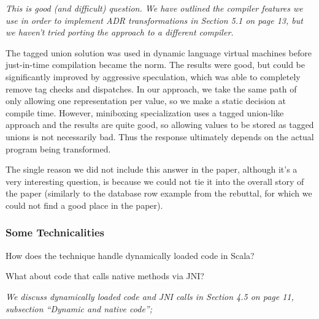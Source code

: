 \documentclass[9pt]{article}
\newenvironment{packed_item}{
\begin{itemize}
  \setlength{\itemsep}{1pt}
  \setlength{\parskip}{0.2pt}
  \setlength{\parsep}{0.2pt}
}{
  \end{itemize}
}
\newenvironment{reviewer-addr}
{ \color{OliveGreen} \framebox{{\bf FEEDBACK}} }
{  }
\newenvironment{answer}
{ \em \framebox{{\bf AUTHOR RESPONSE}} }
{  }
\begin{document}
\begin{answer}
This is good (and difficult) question. We have outlined the compiler features we use
in order to implement ADR transformations in Section 5.1 on page 13, but
we haven't tried porting the approach to a different compiler.

The tagged union solution was used in dynamic language virtual machines
before just-in-time compilation became the norm. The results were good,
but could be significantly improved by aggressive speculation, which was
able to completely remove tag checks and dispatches. In our approach, we
take the same path of only allowing one representation per value, so we
make a static decision at compile time. However, miniboxing specialization
uses a tagged union-like approach and the results are quite good, so
allowing values to be stored as tagged unions is not necessarily bad.
Thus the response ultimately depends on the actual program being transformed.

The single reason we did not include this answer in the paper, although
it's a very interesting question, is because we could not tie it into the
overall story of the paper (similarly to the database row example from
the rebuttal, for which we could not find a good place in the paper).
\end{answer}

\vspace{5mm}

\subsubsection{Some Technicalities}

\begin{reviewer-addr}
\begin{packed_item}
\item How does the technique handle dynamically loaded code in Scala?
\item What about code that calls native methods via JNI?
\end{packed_item}
\end{reviewer-addr}

\begin{answer}
We discuss dynamically loaded code and JNI calls in Section 4.5 on page 11, subsection ``Dynamic and native code'';
\end{answer}
\end{document}
